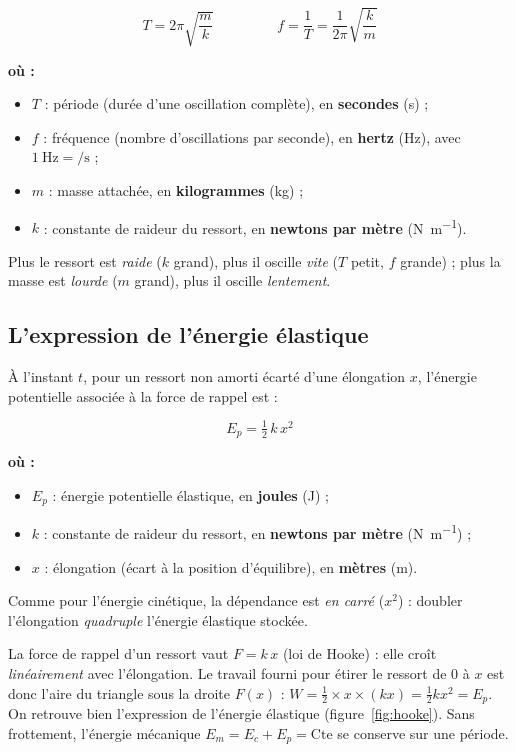 \documentclass[11pt,a4paper]{article}
\newenvironment{ou}{%
  \par\smallskip\noindent\textbf{où :}\nopagebreak
  \begin{itemize}[leftmargin=1.8em,topsep=2pt,itemsep=1.5pt,parsep=0pt]}%
  {\end{itemize}}
\begin{document}
\begin{formule}
\[
\boxed{\;T=2\pi\sqrt{\dfrac{m}{k}}\;}\qquad\qquad
\boxed{\;f=\dfrac{1}{T}=\dfrac{1}{2\pi}\sqrt{\dfrac{k}{m}}\;}
\]
\begin{ou}
  \item $T$ : période (durée d'une oscillation complète), en \textbf{secondes} (\si{\second}) ;
  \item $f$ : fréquence (nombre d'oscillations par seconde), en \textbf{hertz} (\si{\hertz}), avec $\SI{1}{\hertz}=\si{\per\second}$ ;
  \item $m$ : masse attachée, en \textbf{kilogrammes} (\si{\kilogram}) ;
  \item $k$ : constante de raideur du ressort, en \textbf{newtons par mètre} (\si{\newton\per\metre}).
\end{ou}
Plus le ressort est \emph{raide} ($k$ grand), plus il oscille \emph{vite} ($T$ petit, $f$ grande) ;
plus la masse est \emph{lourde} ($m$ grand), plus il oscille \emph{lentement}.
\end{formule}

\subsection{L'expression de l'énergie élastique}

À l'instant $t$, pour un ressort non amorti écarté d'une élongation $x$, l'énergie potentielle
associée à la force de rappel est :

\begin{formule}
\[
\boxed{\;E_p=\tfrac12\,k\,x^2\;}
\]
\begin{ou}
  \item $E_p$ : énergie potentielle élastique, en \textbf{joules} (\si{\joule}) ;
  \item $k$ : constante de raideur du ressort, en \textbf{newtons par mètre} (\si{\newton\per\metre}) ;
  \item $x$ : élongation (écart à la position d'équilibre), en \textbf{mètres} (\si{\metre}).
\end{ou}
Comme pour l'énergie cinétique, la dépendance est \emph{en carré} ($x^2$) : doubler l'élongation
\emph{quadruple} l'énergie élastique stockée.
\end{formule}

\begin{remarque}
La force de rappel d'un ressort vaut $F=k\,x$ (loi de Hooke) : elle croît \emph{linéairement} avec
l'élongation. Le travail fourni pour étirer le ressort de $0$ à $x$ est donc l'aire du triangle sous
la droite $F(x)$ : \(W=\tfrac12\times x\times(kx)=\tfrac12 k x^2=E_p.\) On retrouve bien l'expression
de l'énergie élastique (figure~\ref{fig:hooke}). Sans frottement, l'énergie mécanique
$E_m=E_c+E_p=\text{Cte}$ se conserve sur une période.
\end{remarque}
\end{document}
